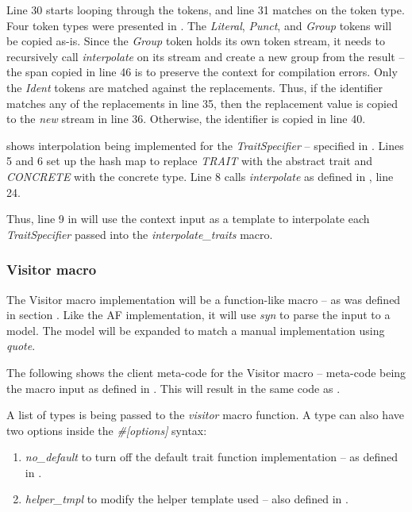 Line 30 starts looping through the tokens, and line 31 matches on the token type.
Four token types were presented in .
The \textit{Literal}, \textit{Punct}, and \textit{Group} tokens will be copied as-is.
Since the \textit{Group} token holds its own token stream, it needs to recursively call \textit{interpolate} on its stream and create a new group from the result -- the span copied in line 46 is to preserve the context for compilation errors.
Only the \textit{Ident} tokens are matched against the replacements.
Thus, if the identifier matches any of the replacements in line 35, then the replacement value is copied to the \textit{new} stream in line 36.
Otherwise, the identifier is copied in line 40.

 shows interpolation being implemented for the \textit{TraitSpecifier} -- specified in .
Lines 5 and 6 set up the hash map to replace \textit{TRAIT} with the abstract trait and \textit{CONCRETE} with the concrete type.
Line 8 calls \textit{interpolate} as defined in , line 24.

Thus, line 9 in  will use the context input as a template to interpolate each \textit{TraitSpecifier} passed into the \textit{interpolate\_traits} macro.

\subsubsection{Visitor macro}
The Visitor macro implementation will be a function-like macro -- as was defined in section .
Like the AF implementation, it will use \textit{syn} to parse the input to a model.
The model will be expanded to match a manual implementation using \textit{quote}.

The following shows the client meta-code for the Visitor macro -- meta-code being the macro input as defined in .
This will result in the same code as .


A list of types is being passed to the \textit{visitor} macro function.
A type can also have two options inside the \textit{\#[options]} syntax:
\begin{enumerate}
	\item \textit{no\_default} to turn off the default trait function implementation -- as defined in .
	\item \textit{helper\_tmpl} to modify the helper template used -- also defined in .
\end{enumerate}

